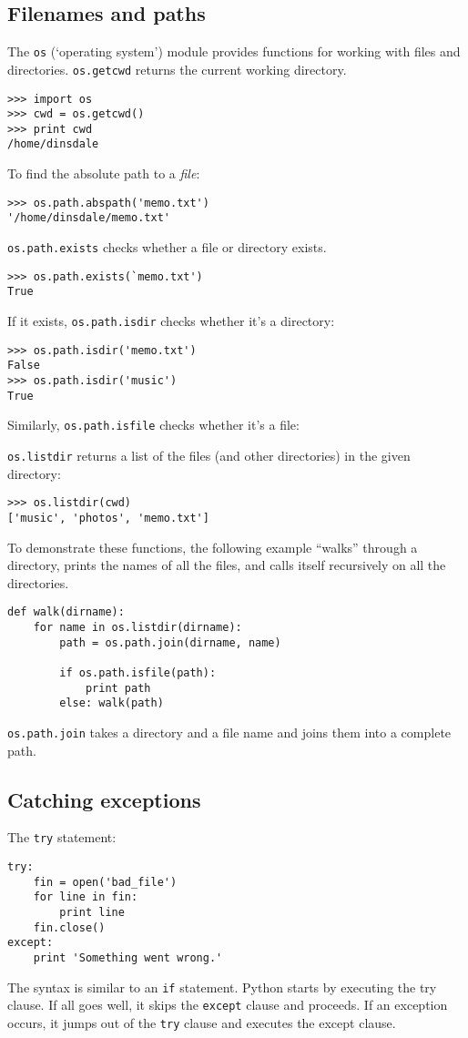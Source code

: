 \documentclass{article}
\begin{document}
\subsection{Filenames and paths} %
The \verb|os| (`operating system') module provides functions for working with
files and directories. \verb|os.getcwd| returns the current working directory.
\begin{verbatim}
>>> import os
>>> cwd = os.getcwd()
>>> print cwd
/home/dinsdale
\end{verbatim}
To find the absolute path to a \emph{file}:
\begin{verbatim}
>>> os.path.abspath('memo.txt')
'/home/dinsdale/memo.txt'
\end{verbatim}
\verb|os.path.exists| checks whether a file or directory exists.
\begin{verbatim}
>>> os.path.exists(`memo.txt')
True
\end{verbatim}

If it exists, \verb|os.path.isdir| checks whether it's a directory:
\begin{verbatim}
>>> os.path.isdir('memo.txt')
False
>>> os.path.isdir('music')
True
\end{verbatim}
Similarly, \verb|os.path.isfile| checks whether it's a file:

\verb|os.listdir| returns a list of the files (and other directories) in the given
directory:
\begin{verbatim}
>>> os.listdir(cwd)
['music', 'photos', 'memo.txt']
\end{verbatim}
To demonstrate these functions, the following example ``walks'' through a
directory, prints the names of all the files, and calls itself recursively on
all the directories.
\begin{verbatim}
def walk(dirname):
    for name in os.listdir(dirname):
        path = os.path.join(dirname, name)

        if os.path.isfile(path):
            print path
        else: walk(path)
\end{verbatim}
\verb|os.path.join| takes a directory and a file name and joins them into a
complete path. 

\subsection{Catching exceptions} %

The \verb|try| statement:
\begin{verbatim}
try:    
    fin = open('bad_file')
    for line in fin:
        print line
    fin.close()
except:
    print 'Something went wrong.'
\end{verbatim}
The syntax is similar to an \verb|if| statement.  Python starts by executing
the try clause. If all goes well, it skips the \verb|except| clause and
proceeds.  If an exception occurs, it jumps out of the \verb|try| clause and
executes the except clause.
\end{document}
